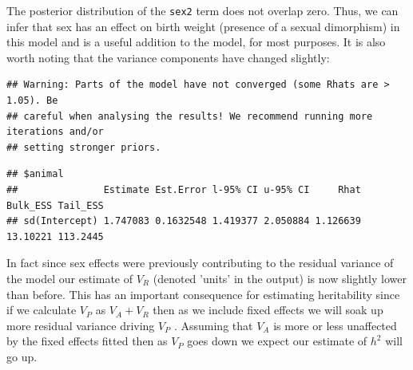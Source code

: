 \documentclass[
  12pt,
]{book}
\newenvironment{Shaded}{\begin{snugshade}}{\end{snugshade}}
\newcommand{\DataTypeTok}[1]{\textcolor[rgb]{0.13,0.29,0.53}{#1}}
\newcommand{\DecValTok}[1]{\textcolor[rgb]{0.00,0.00,0.81}{#1}}
\newcommand{\FloatTok}[1]{\textcolor[rgb]{0.00,0.00,0.81}{#1}}
\newcommand{\KeywordTok}[1]{\textcolor[rgb]{0.13,0.29,0.53}{\textbf{#1}}}
\newcommand{\NormalTok}[1]{#1}
\newcommand{\OperatorTok}[1]{\textcolor[rgb]{0.81,0.36,0.00}{\textbf{#1}}}
\newcommand{\OtherTok}[1]{\textcolor[rgb]{0.56,0.35,0.01}{#1}}
\newcommand{\StringTok}[1]{\textcolor[rgb]{0.31,0.60,0.02}{#1}}
\begin{document}
The posterior distribution of the \texttt{sex2} term does not overlap zero. Thus, we can infer that sex has an effect on birth weight (presence of a sexual dimorphism) in this model and is a useful addition to the model, for most purposes. It is also worth noting that the variance components have changed slightly:

\begin{Shaded}
\end{Shaded}

\begin{verbatim}
## Warning: Parts of the model have not converged (some Rhats are > 1.05). Be
## careful when analysing the results! We recommend running more iterations and/or
## setting stronger priors.
\end{verbatim}

\begin{verbatim}
## $animal
##               Estimate Est.Error l-95% CI u-95% CI     Rhat Bulk_ESS Tail_ESS
## sd(Intercept) 1.747083 0.1632548 1.419377 2.050884 1.126639 13.10221 113.2445
\end{verbatim}

In fact since sex effects were previously contributing to the residual variance of the model our estimate of \(V_R\) (denoted 'units' in the output) is now slightly lower than before. This has an important consequence for estimating heritability since if we calculate \(V_P\) as \(V_A +V_R\) then as we include fixed effects we will soak up more residual variance driving \(V_P\) . Assuming that \(V_A\) is more or less unaffected by the fixed effects fitted then as \(V_P\) goes down we expect our estimate of \(h^2\) will go up.

\begin{Shaded}
\end{Shaded}
\end{document}
